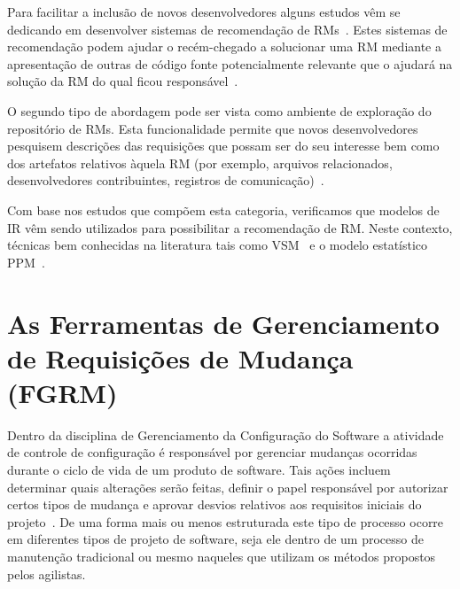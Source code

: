 Para facilitar a inclusão de novos desenvolvedores alguns estudos vêm se
dedicando em desenvolver sistemas de recomendação de
RMs~\cite{malheiros2012source, Wang2011bug}. Estes sistemas de recomendação
podem ajudar o recém-chegado a solucionar uma RM mediante a apresentação de
outras de código fonte potencialmente relevante que o ajudará na solução da RM
do qual ficou responsável~\cite{malheiros2012source}.

O segundo tipo de abordagem pode ser vista como ambiente de exploração do
repositório de RMs.  Esta funcionalidade permite que novos desenvolvedores
pesquisem descrições das requisições que possam ser do seu interesse bem como
dos artefatos relativos àquela RM (por exemplo, arquivos relacionados,
desenvolvedores contribuintes, registros de comunicação)~\cite{Wang2011bug}.

Com base nos estudos que compõem esta categoria, verificamos que modelos de IR
vêm sendo utilizados para possibilitar a recomendação de RM\@. Neste contexto,
técnicas bem conhecidas na literatura tais como VSM~\cite{Wang2011bug} e o
modelo estatístico PPM~\cite{malheiros2012source}.

\section{As Ferramentas de Gerenciamento de Requisições de Mudança (FGRM)}
\label{sec:ferramentas_de_gerenciamento_requisicoes_de_mudanca}

Dentro da disciplina de Gerenciamento da Configuração do Software a atividade de
controle de configuração é responsável por gerenciar mudanças ocorridas durante
o ciclo de vida de um produto de software. Tais ações incluem determinar quais
alterações serão feitas, definir o papel responsável por autorizar certos tipos
de mudança e aprovar desvios relativos aos requisitos iniciais do
projeto~\cite{4425813}. De uma forma mais ou menos estruturada este tipo de
processo ocorre em diferentes tipos de projeto de software, seja ele dentro de
um processo de manutenção tradicional ou mesmo naqueles que utilizam os métodos
propostos pelos agilistas.

